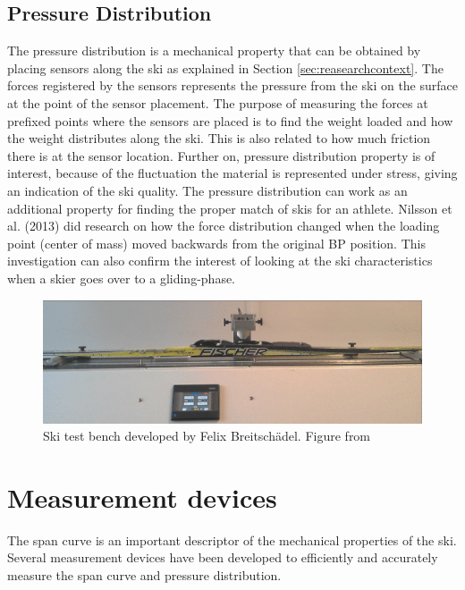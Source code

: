 \subsection{Pressure Distribution}
\label{subsec:pressuredistribution}
The pressure distribution is a mechanical property that can be obtained by placing sensors along the ski as explained in Section \ref{sec:reasearchcontext}. The forces registered by the sensors represents the pressure from the ski on the surface at the point of the sensor placement. The purpose of measuring the forces at prefixed points where the sensors are placed is to find the weight loaded and how the weight distributes along the ski. This is also related to how much friction there is at the sensor location. Further on, pressure distribution property is of interest, because of the fluctuation the material is represented under stress, giving an indication of the ski quality. The pressure distribution can work as an additional property for finding the proper match of skis for an athlete. Nilsson et al. (2013) did research on how the force distribution changed when the loading point (center of mass) moved backwards from the original BP position. This investigation can also confirm the interest of looking at the ski characteristics when a skier goes over to a gliding-phase.

\begin{figure}
    \centering
    \includegraphics[width=1\textwidth]{figures/testbench.png}
    \caption{Ski test bench developed by Felix Breitschädel. Figure from \citep{breitschadel_technical_2014}}
    \label{fig:tbfelix}
\end{figure}

\section{Measurement devices}
\label{sec:measurementdevices}
The span curve is an important descriptor of the mechanical properties of the ski. Several measurement devices have been developed to efficiently and accurately measure the span curve and pressure distribution.

